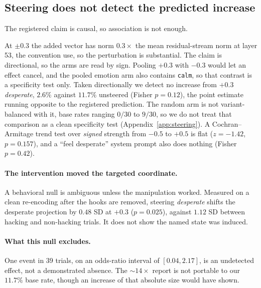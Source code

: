 \documentclass{article}
\begin{document}
\subsection{Steering does not detect the predicted increase}
\label{sec:causal}

The registered claim is causal, so association is not enough.

At $\pm0.3$ the added vector has norm $0.3\times$ the mean residual-stream norm at
layer 53, the convention \citet{sofroniew2026} use, so the perturbation is
substantial.
The claim is directional, so the arms are read by sign. Pooling $+0.3$ with $-0.3$
would let an effect cancel, and the pooled emotion arm also contains \texttt{calm},
so that contrast is a specificity test only. Taken
directionally we detect no increase from $+0.3$ \emph{desperate}, $2.6\%$ against
$11.7\%$ unsteered (Fisher $p = 0.12$), the point estimate running opposite to the
registered prediction. The random arm is not variant-balanced with it, base rates
ranging $0/30$ to $9/30$, so we do not treat that comparison as a clean
specificity test (Appendix~\ref{app:steering}). A Cochran--Armitage trend test
over \emph{signed} strength from $-0.5$ to $+0.5$ is flat ($z = -1.42$,
$p = 0.157$), and a ``feel desperate'' system prompt also does nothing
(Fisher $p = 0.42$).

\paragraph{The intervention moved the targeted coordinate.} A behavioral null is
ambiguous unless the manipulation worked. Measured on a clean re-encoding after the
hooks are removed, steering \emph{desperate} shifts the desperate projection by
$0.48$ SD at $+0.3$ ($p = 0.025$), against $1.12$ SD between hacking and non-hacking
trials. It does not show the named state was induced.

\paragraph{What this null excludes.} One event in 39 trials, on an odds-ratio interval of
$[0.04, 2.17]$, is an undetected effect, not a demonstrated absence. The ${\sim}14\times$ \citet{sofroniew2026} report is not portable to our
$11.7\%$ base rate, though an increase of that absolute size would have shown.
\end{document}
